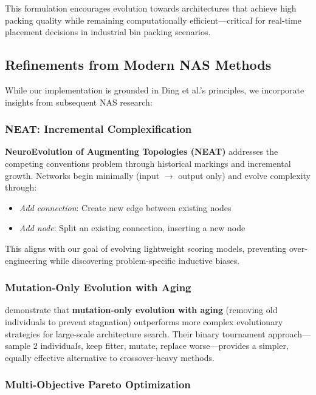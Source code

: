 This formulation encourages evolution towards architectures that achieve high packing quality while remaining computationally efficient—critical for real-time placement decisions in industrial bin packing scenarios.

\subsection{Refinements from Modern NAS Methods}
\label{subsec:modern_nas}

While our implementation is grounded in Ding et al.'s principles, we incorporate insights from subsequent NAS research:

\subsubsection{NEAT: Incremental Complexification}

\textbf{NeuroEvolution of Augmenting Topologies (NEAT)} \cite{Stanley2002} addresses the competing conventions problem through historical markings and incremental growth. Networks begin minimally (input $\rightarrow$ output only) and evolve complexity through:
\begin{itemize}
    \item \textit{Add connection}: Create new edge between existing nodes
    \item \textit{Add node}: Split an existing connection, inserting a new node
\end{itemize}

This aligns with our goal of evolving lightweight scoring models, preventing over-engineering while discovering problem-specific inductive biases.

\subsubsection{Mutation-Only Evolution with Aging}

\citet{Real2017} demonstrate that \textbf{mutation-only evolution with aging} (removing old individuals to prevent stagnation) outperforms more complex evolutionary strategies for large-scale architecture search. Their binary tournament approach—sample 2 individuals, keep fitter, mutate, replace worse—provides a simpler, equally effective alternative to crossover-heavy methods.

\subsubsection{Multi-Objective Pareto Optimization}

